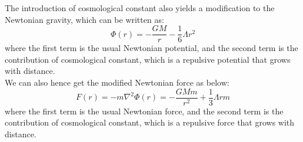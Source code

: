 \clearpage
\begin{theory}
    The introduction of cosmological constant also yields a modification to the Newtonian gravity, which can be written as:
    \[
        \Phi(r) = -\frac{GM}{r} - \frac{1}{6}\Lambda r^2
    \]
    where the first term is the usual Newtonian potential, and the second term is the contribution of cosmological constant, which is a repulsive potential that grows with distance. \\

    We can also hence get the modified Newtonian force as below:
    \[
        F(r) = -m \nabla^2 \Phi(r) = -\frac{GM m}{r^2} + \frac{1}{3}\Lambda r m
    \]
    where the first term is the usual Newtonian force, and the second term is the contribution of cosmological constant, which is a repulsive force that grows with distance. \\
\end{theory}

